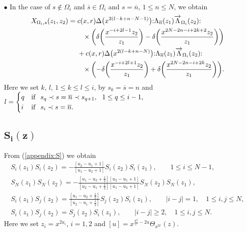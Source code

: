\documentclass[10pt,a4paper]{amsart}
\numberwithin{equation}{section}
\begin{document}
\noindent
$\bullet$
In the case of $s \notin \Omega_i$ and $\overline{s} \in \Omega_i$ and
$s=\overline{n}$, $1\leq n \leq N$, we obtain
\begin{align}
X_{\Omega_i,s}(z_1,z_2)={}&
c(x,r)\Delta\big(x^{2(l-k+n-N-1)}\big)
{:}\Lambda_{\overline{n}}(z_1)\overrightarrow{\Lambda}_{\Omega_i}(z_2){:}\notag
\\
&\phantom{+}\times\bigg(\delta\bigg(\frac{x^{-i+2l-1}z_2}{z_1}\bigg)-
\delta\bigg(\frac{x^{2N-2n-i+2k+2} z_2}{z_1}\bigg)\bigg)\notag
\\
&+c(x,r)\Delta\big(x^{2(l-k+n-N)}\big)
{:}\Lambda_{\overline{n}}(z_1)\overrightarrow{\Lambda}_{\Omega_i}(z_2){:}\notag
\\
&\phantom{+}\times\bigg({-}\delta\bigg(\frac{x^{-i+2l+1}z_2}{z_1}\bigg)+
\delta\bigg(\frac{x^{2N-2n-i+2k} z_2}{z_1}\bigg)\bigg).
\label{exchange:L7}
\end{align}
Here we set $k$, $l$, $1\leq k \leq l \leq i$, by
$s_k=\overline{s}=n$ and $l=\begin{cases}
q&{\rm if}\ \ s_{q} \prec s=\overline{n} \prec s_{q+1},\ \ 1 \leq q \leq i-1,\\
i&{\rm if}\ \ s_i \prec s=\overline{n}.
\end{cases}$



\subsection[\protect{$S\_\{i\}(z)$}]{$\boldsymbol{S_i(z)}$}
From (\ref{appendix:S}) we obtain
\begin{gather}
S_i(z_1)S_i(z_2)=-\frac{[u_2-u_1+1]}{[u_1-u_2+1]}S_i(z_2)S_i(z_1),\qquad
1\leq i \leq N-1,\nonumber
\\
S_N(z_1)S_N(z_2)=-\frac{[u_1-u_2+\frac{1}{2}][u_2-u_1+1]}{
[u_2-u_1+\frac{1}{2}][u_1-u_2+1]}S_N(z_2)S_N(z_1),\nonumber
\\
S_i(z_1)S_j(z_2)=\frac{[u_1-u_2+\frac{1}{2}]}{[u_2-u_1+\frac{1}{2}]}S_j(z_2)S_i(z_1),\qquad
|i-j|=1,\quad 1\leq i,j \leq N,\nonumber
\\
S_i(z_1)S_j(z_2)=S_j(z_2)S_i(z_1),\qquad
|i-j|\geq 2,\quad 1\leq i,j \leq N.\label{exchange:S}
\end{gather}
Here we set $z_i=x^{2u_i}$, $i=1,2$ and
$[u]=x^{\frac{u^2}{r}-2u}\Theta_{x^{2r}}(z)$.
\end{document}
